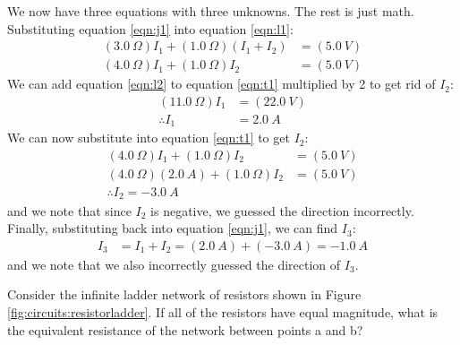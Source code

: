 \begin{solution}
We now have three equations with three unknowns. The rest is just math. Substituting equation \ref{eqn:j1} into equation \ref{eqn:l1}:
\begin{align}
\label{eqn:t1}
(\SI{3.0}{\Omega}) I_1 + (\SI{1.0}{\Omega}) (I_1+I_2) &=(\SI{5.0}{V})\nonumber\\
(\SI{4.0}{\Omega}) I_1 +(\SI{1.0}{\Omega})I_2&=(\SI{5.0}{V})
\end{align}
We can add equation \ref{eqn:l2} to equation \ref{eqn:t1} multiplied by 2 to get rid of $I_2$:
\begin{align*}
(\SI{11.0}{\Omega}) I_1&=(\SI{22.0}{V})\\
\therefore I_1&=\SI{2.0}{A}
\end{align*}
We can now substitute into equation \ref{eqn:t1} to get $I_2$:
\begin{align*}
(\SI{4.0}{\Omega}) I_1 +(\SI{1.0}{\Omega})I_2&=(\SI{5.0}{V})\\
(\SI{4.0}{\Omega})(\SI{2.0}{A}) +(\SI{1.0}{\Omega})I_2&=(\SI{5.0}{V})\\
\therefore I_2=\SI{-3.0}{A}
\end{align*}
and we note that since $I_2$ is negative, we guessed the direction incorrectly. Finally, substituting back into equation \ref{eqn:j1}, we can find $I_3$:
\begin{align*}
I_3&=I_1+I_2=(\SI{2.0}{A})+(\SI{-3.0}{A})=\SI{-1.0}{A}
\end{align*}
and we note that we also incorrectly guessed the direction of $I_3$.
\end{solution}

\question Consider the infinite ladder network of resistors shown in Figure \ref{fig:circuits:resistorladder}. If all of the resistors have equal magnitude, what is the equivalent resistance of the network between points a and b?

